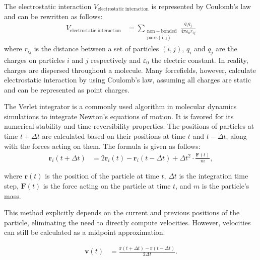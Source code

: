 \documentclass[conference]{IEEEtran}
\begin{document}
The electrostatic interaction $V_{\mathrm{electrostatic \; interaction}}$ is represented by Coulomb's law and can 
be rewritten as follows: 
\begin{equation}
    \begin{aligned}
    V_{\mathrm{electrostatic \; interaction}} &= \sum_{\mathrm{\substack{\mathrm{non-bonded} \\ \mathrm{pairs(i,j)}}}} \frac{q_i q_j}{4\pi\varepsilon_0r_{ij}}
    \end{aligned}
\end{equation}
where $r_{ij}$ is the distance between a set of particles $(i,j)$, $q_i$ and $q_j$ are the charges on particles $i$ 
and $j$ respectively and $\varepsilon_0$ the electric constant. In reality, charges are dispersed throughout a 
molecule. Many forcefields, however, calculate electrostatic interaction by using Coulomb's law, assuming all charges 
are static and can be represented as point charges. 

The Verlet integrator is a commonly used algorithm in molecular dynamics simulations to integrate Newton's equations 
of motion. It is favored for its numerical stability and time-reversibility properties. The positions of particles 
at time \( t + \Delta t \) are calculated based on their positions at time \( t \) and \( t - \Delta t \), along 
with the forces acting on them. The formula is given as follows:
\begin{align}
    \mathbf{r}_i(t + \Delta t) &= 2\mathbf{r}_i(t) - \mathbf{r}_i(t - \Delta t) + \Delta t^2 \cdot \frac{\mathbf{F}(t)}{m},
\end{align}

where \( \mathbf{r}(t) \) is the position of the particle at time \( t \), \( \Delta t \) is the integration time 
step, \( \mathbf{F}(t) \) is the force acting on the particle at time \( t \), and \( m \) is the particle's mass.

This method explicitly depends on the current and previous positions of the particle, eliminating the need to directly 
compute velocities. However, velocities can still be calculated as a midpoint approximation:

\begin{equation}
    \begin{aligned}
    \mathbf{v}(t) &= \frac{\mathbf{r}(t + \Delta t) - \mathbf{r}(t - \Delta t)}{2\Delta t}.
    \end{aligned}
\end{equation}

\end{document}
